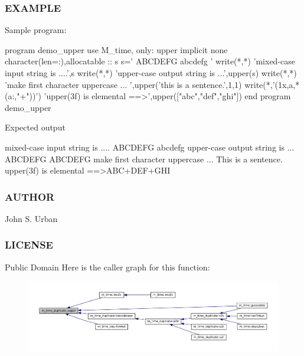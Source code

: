 \subsubsection*{E\+X\+A\+M\+P\+LE}

\begin{DoxyVerb}Sample program:

 program demo_upper
 use M_time, only: upper
 implicit none
 character(len=:),allocatable  :: s
    s=' ABCDEFG abcdefg '
    write(*,*) 'mixed-case input string is ....',s
    write(*,*) 'upper-case output string is ...',upper(s)
    write(*,*) 'make first character uppercase  ... ',upper('this is a sentence.',1,1)
    write(*,'(1x,a,*(a:,"+"))') 'upper(3f) is elemental ==>',upper(["abc","def","ghi"])
 end program demo_upper

Expected output

 mixed-case input string is .... ABCDEFG abcdefg
 upper-case output string is ... ABCDEFG ABCDEFG
 make first character uppercase  ... This is a sentence.
 upper(3f) is elemental ==>ABC+DEF+GHI
\end{DoxyVerb}
 \subsubsection*{A\+U\+T\+H\+OR}

John S. Urban \subsubsection*{L\+I\+C\+E\+N\+SE}

Public Domain Here is the caller graph for this function\+:\nopagebreak
\begin{figure}[H]
\begin{center}
\leavevmode
\includegraphics[width=350pt]{namespacem__time__duplicate_aabdd1a3e01b26e896bd06aee488de7c6_icgraph}
\end{center}
\end{figure}
\mbox{\label{namespacem__time__duplicate_ab836a3b7c441e5b324639db734b7de9f}} 
